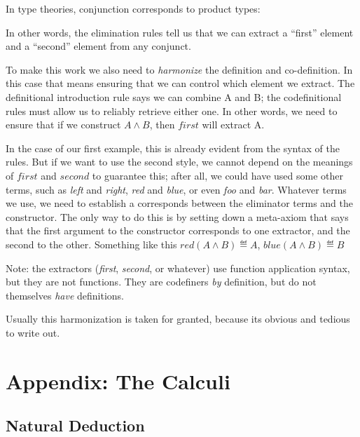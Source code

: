 \documentclass{article}
\begin{document}
In type theories, conjunction corresponds to product types:


In other words, the elimination rules tell us that we can extract a ``first'' element and a ``second'' element from any conjunct.

To make this work we also need to \textit{harmonize} the definition
and co-definition. In this case that means ensuring that we can
control which element we extract. The definitional introduction rule
says we can combine A and B; the codefinitional rules must allow us to
reliably retrieve either one. In other words, we need to ensure that
if we construct \(A\land B\), then \(first\) will extract A.

In the case of our first example, this is already evident from the
syntax of the rules. But if we want to use the second style, we cannot
depend on the meanings of \(first\) and \(second\) to guarantee this;
after all, we could have used some other terms, such as \textit{left}
and \textit{right}, \textit{red} and \textit{blue}, or even
\textit{foo} and \textit{bar}. Whatever terms we use, we need to
establish a corresponds between the eliminator terms and the
constructor. The only way to do this is by setting down a meta-axiom
that says that the first argument to the constructor corresponds to
one extractor, and the second to the other. Something like this
\(red(A\land B)\eqdef A\), \(blue(A\land B)\eqdef B\)

Note: the extractors (\textit{first}, \textit{second}, or whatever)
use function application syntax, but they are not functions. They are
codefiners \textit{by} definition, but do not themselves \textit{have}
definitions.

Usually this harmonization is taken for granted, because its obvious
and tedious to write out.


\section{Appendix: The Calculi}

\subsection{Natural Deduction}
\end{document}
